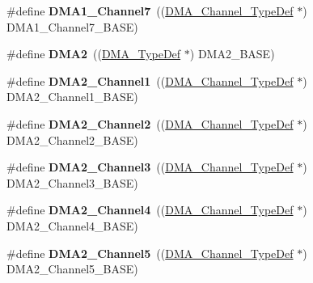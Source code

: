 \begin{DoxyCompactItemize}
\item 
\hypertarget{group___peripheral__declaration_ga4f9c23b3d1add93ed206b5c9afa5cda3}{\#define {\bfseries D\-M\-A1\-\_\-\-Channel7}~((\hyperlink{struct_d_m_a___channel___type_def}{D\-M\-A\-\_\-\-Channel\-\_\-\-Type\-Def} $\ast$) D\-M\-A1\-\_\-\-Channel7\-\_\-\-B\-A\-S\-E)}\label{group___peripheral__declaration_ga4f9c23b3d1add93ed206b5c9afa5cda3}

\item 
\hypertarget{group___peripheral__declaration_ga506520140eec1708bc7570c49bdf972d}{\#define {\bfseries D\-M\-A2}~((\hyperlink{struct_d_m_a___type_def}{D\-M\-A\-\_\-\-Type\-Def} $\ast$) D\-M\-A2\-\_\-\-B\-A\-S\-E)}\label{group___peripheral__declaration_ga506520140eec1708bc7570c49bdf972d}

\item 
\hypertarget{group___peripheral__declaration_gad86c75e1ff89e03e15570f47962865c8}{\#define {\bfseries D\-M\-A2\-\_\-\-Channel1}~((\hyperlink{struct_d_m_a___channel___type_def}{D\-M\-A\-\_\-\-Channel\-\_\-\-Type\-Def} $\ast$) D\-M\-A2\-\_\-\-Channel1\-\_\-\-B\-A\-S\-E)}\label{group___peripheral__declaration_gad86c75e1ff89e03e15570f47962865c8}

\item 
\hypertarget{group___peripheral__declaration_ga316024020799373b9d8e35c316c74f24}{\#define {\bfseries D\-M\-A2\-\_\-\-Channel2}~((\hyperlink{struct_d_m_a___channel___type_def}{D\-M\-A\-\_\-\-Channel\-\_\-\-Type\-Def} $\ast$) D\-M\-A2\-\_\-\-Channel2\-\_\-\-B\-A\-S\-E)}\label{group___peripheral__declaration_ga316024020799373b9d8e35c316c74f24}

\item 
\hypertarget{group___peripheral__declaration_ga6dca52a79587e0ca9a5d669048b4c7eb}{\#define {\bfseries D\-M\-A2\-\_\-\-Channel3}~((\hyperlink{struct_d_m_a___channel___type_def}{D\-M\-A\-\_\-\-Channel\-\_\-\-Type\-Def} $\ast$) D\-M\-A2\-\_\-\-Channel3\-\_\-\-B\-A\-S\-E)}\label{group___peripheral__declaration_ga6dca52a79587e0ca9a5d669048b4c7eb}

\item 
\hypertarget{group___peripheral__declaration_ga612b396657695191ad740b0b59bc9f12}{\#define {\bfseries D\-M\-A2\-\_\-\-Channel4}~((\hyperlink{struct_d_m_a___channel___type_def}{D\-M\-A\-\_\-\-Channel\-\_\-\-Type\-Def} $\ast$) D\-M\-A2\-\_\-\-Channel4\-\_\-\-B\-A\-S\-E)}\label{group___peripheral__declaration_ga612b396657695191ad740b0b59bc9f12}

\item 
\hypertarget{group___peripheral__declaration_ga521c13b7d0f82a6897d47995da392750}{\#define {\bfseries D\-M\-A2\-\_\-\-Channel5}~((\hyperlink{struct_d_m_a___channel___type_def}{D\-M\-A\-\_\-\-Channel\-\_\-\-Type\-Def} $\ast$) D\-M\-A2\-\_\-\-Channel5\-\_\-\-B\-A\-S\-E)}\label{group___peripheral__declaration_ga521c13b7d0f82a6897d47995da392750}


\end{DoxyCompactItemize}
